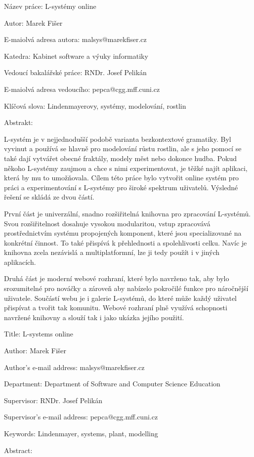 
{
\setlength\parindent{0mm}
\setlength\parskip{5mm}

Název práce: L-systémy online

Autor: Marek Fišer

E-maiolvá adresa autora: malsys@marekfiser.cz

Katedra: Kabinet software a výuky informatiky

Vedoucí bakalářské práce: RNDr. Josef Pelikán

E-maiolvá adresa vedoucího: pepca@cgg.mff.cuni.cz

Klíčová slova: Lindenmayerovy, systémy, modelování, rostlin

Abstrakt:
}
\mbox{L-systém} je v nejjednodušší podobě varianta bezkontextové gramatiky.
Byl vyvi\-nut a používá se hlavně pro modelování růstu rostlin, ale s jeho pomocí se také dají vytvářet obecné fraktály, modely měst nebo dokonce hudba.
Pokud někoho \mbox{L-systémy} zaujmou a chce s nimi experimentovat, je těžké najít aplikaci, která by mu to umožňovala.
Cílem této práce bylo vytvořit online systém pro práci a experimentování s L-systémy pro široké spektrum uživatelů.
Výsledné řešení se skládá ze dvou částí.

První část je univerzální, snadno rozšiřitelná knihovna pro zpracování \mbox{L-sys}\-témů.
Svou rozšiřitelnost dosahuje vysokou modularitou, vstup zpracovává pros\-třednic\-tvím systému propojených komponent, které jsou specializované na kon\-krét\-ní činnost.
To také přispívá k přehlednosti a spolehlivosti celku.
Navíc je knihovna zcela nezávislá a multiplatformní, lze ji tedy použít i v jiných aplikacích.

Druhá část je moderní webové rozhraní, které bylo navrženo tak, aby bylo srozumitelné pro nováčky a zároveň aby nabízelo pokročilé funkce pro nároč\-nější uživatele.
Součástí webu je i galerie L-systémů, do které může každý uživatel přispívat a tvořit tak komunitu.
Webové rozhraní plně využívá schopnosti navr\-žené knihovny a slouží tak i jako ukázka jejího použití.

\newpage

{
\setlength\parindent{0mm}
\setlength\parskip{5mm}

Title: L-systems online

Author: Marek Fišer

Author's e-mail address: malsys@marekfiser.cz

Department: Department of Software and Computer Science Education

Supervisor: RNDr. Josef Pelikán

Supervisor's e-mail address: pepca@cgg.mff.cuni.cz

Keywords: Lindenmayer, systems, plant, modelling

Abstract:
}



